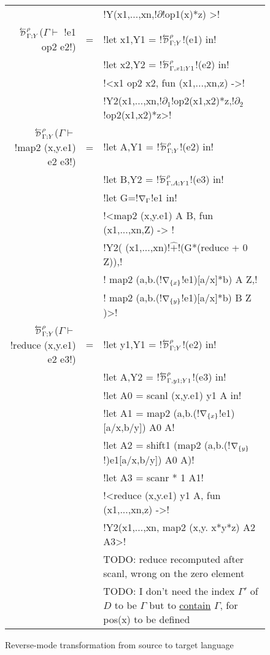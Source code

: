 \begin{figure*}[t]
\begin{tabular}{r c l}
            && !Y(x1,...,xn,!$\partial$!op1(x)*z) >! \\
        $\directD{\rho}{\Gamma}{Y}$($\Gamma\vdash $ !e1 op2 e2!) &=& 
            !let x1,Y1 = !$\directD{\rho}{\Gamma}{Y}$!(e1) in! \\
            && !let x2,Y2 = !$\directD{\rho}{\Gamma,x1}{Y1}$!(e2) in! \\
            && !<x1 op2 x2, fun (x1,...,xn,z) ->! \\
            && !Y2(x1,...,xn,!$\partial_1$!op2(x1,x2)*z,!$\partial_2$!op2(x1,x2)*z>! \\
        $\directD{\rho}{\Gamma}{Y}$($\Gamma\vdash $ !map2 (x,y.e1) e2 e3!) &=&  
            !let A,Y1 = !$\directD{\rho}{\Gamma}{Y}$!(e2) in! \\
            && !let B,Y2 = !$\directD{\rho}{\Gamma,A}{Y1}$!(e3) in! \\
            && !let G=!$\nabla_{\Gamma}$!e1 in!\\
            && !<map2 (x,y.e1) A B, fun (x1,...,xn,Z) -> !\\
            && !Y2( (x1,...,xn)!$\widehat{+}$!(G*(reduce + 0 Z)),!\\
            && \quad\quad! map2 (a,b.(!$\nabla_{\{x\}}$!e1)[a/x]*b) A Z,!\\
            && \quad\quad! map2 (a,b.(!$\nabla_{\{y\}}$!e1)[a/x]*b) B Z )>!\\
        $\directD{\rho}{\Gamma}{Y}$($\Gamma\vdash $ !reduce (x,y.e1) e2 e3!) &=&
            !let y1,Y1 = !$\directD{\rho}{\Gamma}{Y}$!(e2) in! \\
            && !let A,Y2 = !$\directD{\rho}{\Gamma,y1}{Y1}$!(e3) in! \\
            && !let A0 = scanl (x,y.e1) y1 A in! \\
            && !let A1 = map2 (a,b.(!$\nabla_{\{x\}}$!e1)[a/x,b/y]) A0 A! \\
            && !let A2 = shift1 (map2 (a,b.(!$\nabla_{\{y\}}$!)e1[a/x,b/y]) A0 A)! \\
            && !let A3 = scanr * 1 A1! \\
            && !<reduce (x,y.e1) y1 A, fun (x1,...,xn,z) ->! \\
            && !Y2(x1,...,xn, map2 (x,y. x*y*z) A2 A3>! \\
            && TODO: reduce recomputed after scanl, wrong on the zero element \\
            && TODO: I don't need the index $\Gamma'$ of $D$ to be $\Gamma$ but to \underline{contain} $\Gamma$, for pos(x) to be defined
        \end{tabular}
    \caption{Reverse-mode transformation from source to target language}
    \label{fig:direct_diff_macro}    
\end{figure*}